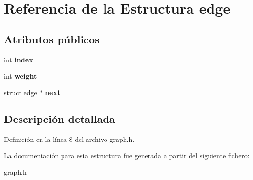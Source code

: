 \hypertarget{structedge}{}\section{Referencia de la Estructura edge}
\label{structedge}
\subsection*{Atributos públicos}
\begin{DoxyCompactItemize}
\item 
\mbox{\label{structedge_a4d9067f195e1b95f485d6658d4797fda}} 
int {\bfseries index}
\item 
\mbox{\label{structedge_a48182e762296a60018039747493814f1}} 
int {\bfseries weight}
\item 
\mbox{\label{structedge_a7da5af10c77515548149dfa87501d073}} 
struct \hyperlink{structedge}{edge} $\ast$ {\bfseries next}
\end{DoxyCompactItemize}


\subsection{Descripción detallada}


Definición en la línea 8 del archivo graph.\+h.



La documentación para esta estructura fue generada a partir del siguiente fichero\+:\begin{DoxyCompactItemize}
\item 
graph.\+h\end{DoxyCompactItemize}
